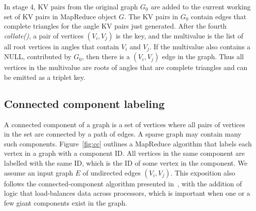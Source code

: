 In stage 4, KV pairs from the original graph $G_0$ are added to the
current working set of KV pairs in MapReduce object $G$.  The KV pairs
in $G_0$ contain edges that complete triangles for the angle KV pairs
just generated.  After the fourth {\it collate()}, a pair of vertices
$(V_i,V_j)$ is the key, and the multivalue is the list of all root
vertices in angles that contain $V_i$ and $V_j$.  If the multivalue
also contains a NULL, contributed by $G_0$, then there is a
$(V_i,V_j)$ edge in the graph.  Thus all vertices in the multivalue
are roots of angles that are complete triangles and can be emitted as
a triplet key.

\subsection{Connected component labeling}

A connected component of a graph is a set of vertices where all pairs
of vertices in the set are connected by a path of edges.  A sparse
graph may contain many such components.  Figure~\ref{fig:cc} outlines
a MapReduce algorithm that labels each vertex in a graph with a
component ID.  All vertices in the same component are labelled with
the same ID, which is the ID of some vertex in the component.  We
assume an input graph $E$ of undirected edges $(V_i,V_j)$.  This
exposition also follows the connected-component algorithm presented
in~\cite{Cohen09}, with the addition of logic that load-balances data
across processors, which is important when one or a few giant
components exist in the graph.

